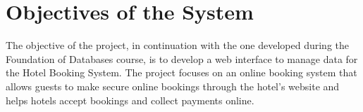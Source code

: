 \section{Objectives of the System}
The objective of the project, in continuation with the one developed during the Foundation of Databases course, is to
develop a web interface to manage data for the Hotel Booking System. The project focuses on an online booking system that allows guests to make secure online bookings through the hotel's website and helps hotels accept bookings and collect payments online.